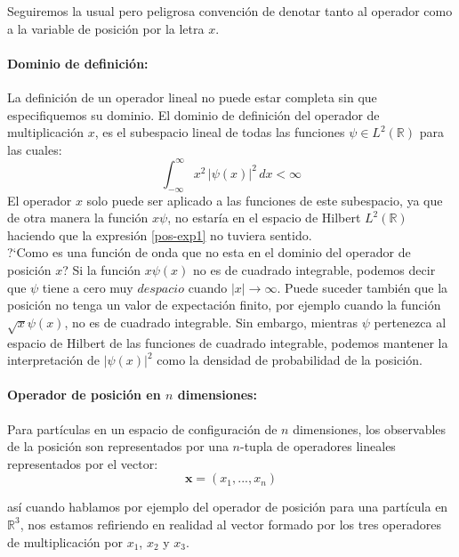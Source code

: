 \documentclass[12pt]{book}
\numberwithin{equation}{chapter}
\def\R{\mathbb{R}}
\def\rar{\rightarrow}
\def\x{\mathbf{x}}
\begin{document}
\rightline{$\dag$}
\vspace{3 mm} 

Seguiremos la usual pero peligrosa convenci\'on de denotar tanto al operador como a la variable de posici\'on por la letra $x$.

\paragraph{Dominio de definici\'on:} La definici\'on de un operador lineal no puede estar completa sin que especifiquemos su dominio. El dominio de definici\'on del operador de multiplicaci\'on $x$, es el subespacio lineal de todas las funciones $\psi \in L^{2}(\R)$ para las cuales:
\begin{equation}
\int_{-\infty}^{\infty} x^{2}\, |\psi(x)|^{2}\, dx < \infty
\end{equation}
El operador $x$ solo puede ser aplicado a las funciones de este subespacio, ya que de otra manera la funci\'on $x \psi$, no estar\'ia en el espacio de Hilbert $L^{2}(\R)$ haciendo que la expresi\'on \eqref{pos-exp1} no tuviera sentido.\\

?`Como es una funci\'on de onda que no esta en el dominio del operador de posici\'on $x$? Si la funci\'on $x \psi(x)$ no es de cuadrado integrable, podemos decir que $\psi$ tiene a cero muy $despacio$ cuando $|x| \rar \infty$. Puede suceder tambi\'en que la posici\'on no tenga un valor de expectaci\'on finito, por ejemplo cuando la funci\'on $ \sqrt{x} \psi (x) $, no es de cuadrado integrable. Sin embargo, mientras $\psi$ pertenezca al espacio de Hilbert de las funciones de cuadrado integrable, podemos mantener la interpretaci\'on de $|\psi (x)|^{2}$ como la densidad de probabilidad de la posici\'on. 

\paragraph{Operador de posici\'on en $n$ dimensiones:} Para part\'iculas en un espacio de configuraci\'on de $n$ dimensiones, los observables de la posici\'on son representados por una $n$-tupla de operadores lineales representados por el vector:
\begin{equation}
\x = ( x_{1},...,x_{n} )
\end{equation} 

as\'i cuando hablamos por ejemplo del operador de posici\'on para una part\'icula en $\R^{3}$, nos estamos refiriendo en realidad al vector formado por los tres operadores de multiplicaci\'on por $x_{1}$, $x_{2}$ y $x_{3}$. 
\end{document}
